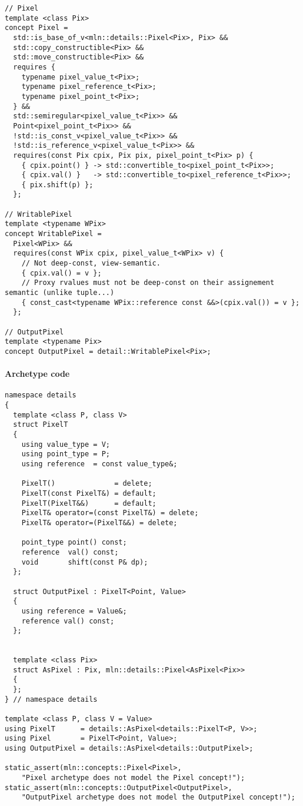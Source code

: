 \begin{verbatim}
// Pixel
template <class Pix>
concept Pixel =
  std::is_base_of_v<mln::details::Pixel<Pix>, Pix> &&
  std::copy_constructible<Pix> &&
  std::move_constructible<Pix> &&
  requires {
    typename pixel_value_t<Pix>;
    typename pixel_reference_t<Pix>;
    typename pixel_point_t<Pix>;
  } &&
  std::semiregular<pixel_value_t<Pix>> &&
  Point<pixel_point_t<Pix>> &&
  !std::is_const_v<pixel_value_t<Pix>> &&
  !std::is_reference_v<pixel_value_t<Pix>> &&
  requires(const Pix cpix, Pix pix, pixel_point_t<Pix> p) {
    { cpix.point() } -> std::convertible_to<pixel_point_t<Pix>>;
    { cpix.val() }   -> std::convertible_to<pixel_reference_t<Pix>>;
    { pix.shift(p) };
  };

// WritablePixel
template <typename WPix>
concept WritablePixel =
  Pixel<WPix> &&
  requires(const WPix cpix, pixel_value_t<WPix> v) {
    // Not deep-const, view-semantic.
    { cpix.val() = v };
    // Proxy rvalues must not be deep-const on their assignement semantic (unlike tuple...)
    { const_cast<typename WPix::reference const &&>(cpix.val()) = v };
  };

// OutputPixel
template <typename Pix>
concept OutputPixel = detail::WritablePixel<Pix>;
\end{verbatim}

\paragraph{Archetype code}

\begin{verbatim}
namespace details
{
  template <class P, class V>
  struct PixelT
  {
    using value_type = V;
    using point_type = P;
    using reference  = const value_type&;

    PixelT()              = delete;
    PixelT(const PixelT&) = default;
    PixelT(PixelT&&)      = default;
    PixelT& operator=(const PixelT&) = delete;
    PixelT& operator=(PixelT&&) = delete;

    point_type point() const;
    reference  val() const;
    void       shift(const P& dp);
  };

  struct OutputPixel : PixelT<Point, Value>
  {
    using reference = Value&;
    reference val() const;
  };


  template <class Pix>
  struct AsPixel : Pix, mln::details::Pixel<AsPixel<Pix>>
  {
  };
} // namespace details

template <class P, class V = Value>
using PixelT      = details::AsPixel<details::PixelT<P, V>>;
using Pixel       = PixelT<Point, Value>;
using OutputPixel = details::AsPixel<details::OutputPixel>;

static_assert(mln::concepts::Pixel<Pixel>,
    "Pixel archetype does not model the Pixel concept!");
static_assert(mln::concepts::OutputPixel<OutputPixel>,
    "OutputPixel archetype does not model the OutputPixel concept!");
\end{verbatim}


